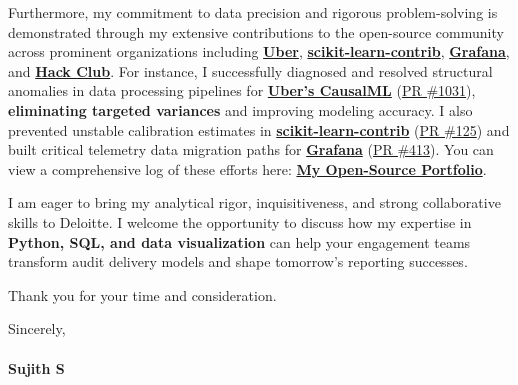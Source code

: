 \documentclass[a4paper,11pt]{article}
\newcommand{\ulink}[2]{\href{#1}{#2}}
\begin{document}
Furthermore, my commitment to data precision and rigorous problem-solving is demonstrated through my extensive contributions to the open-source community across prominent organizations including \ulink{https://github.com/uber}{\textbf{Uber}}, \ulink{https://github.com/scikit-learn-contrib}{\textbf{scikit-learn-contrib}}, \ulink{https://github.com/grafana}{\textbf{Grafana}}, and \ulink{https://github.com/hackclub}{\textbf{Hack Club}}. For instance, I successfully diagnosed and resolved structural anomalies in data processing pipelines for \ulink{https://github.com/uber/causalml}{\textbf{Uber's CausalML}} (\ulink{https://github.com/uber/causalml/pull/1031}{PR \#1031}), \textbf{eliminating targeted variances} and improving modeling accuracy. I also prevented unstable calibration estimates in \ulink{https://github.com/scikit-learn-contrib/forest-confidence-interval}{\textbf{scikit-learn-contrib}} (\ulink{https://github.com/scikit-learn-contrib/forest-confidence-interval/pull/125}{PR \#125}) and built critical telemetry data migration paths for \ulink{https://github.com/grafana/alloy-scenarios}{\textbf{Grafana}} (\ulink{https://github.com/grafana/alloy-scenarios/pull/413}{PR \#413}). You can view a comprehensive log of these efforts here: \ulink{https://github.com/su-jin1425/My-Open-Source-Contributions}{\textbf{My Open-Source Portfolio}}.

I am eager to bring my analytical rigor, inquisitiveness, and strong collaborative skills to Deloitte. I welcome the opportunity to discuss how my expertise in \textbf{Python, SQL, and data visualization} can help your engagement teams transform audit delivery models and shape tomorrow's reporting successes.

Thank you for your time and consideration.

Sincerely, \\
\vspace{5pt} \\
\textbf{Sujith S}
\end{document}
